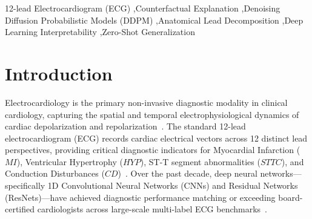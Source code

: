 \documentclass[12pt]{elsarticle}
\begin{document}
\begin{frontmatter}


\begin{keyword}
12-lead Electrocardiogram (ECG) \sep Counterfactual Explanation \sep Denoising Diffusion Probabilistic Models (DDPM) \sep Anatomical Lead Decomposition \sep Deep Learning Interpretability \sep Zero-Shot Generalization
\end{keyword}

\end{frontmatter}

\section{Introduction}
\label{sec:intro}

Electrocardiology is the primary non-invasive diagnostic modality in clinical cardiology, capturing the spatial and temporal electrophysiological dynamics of cardiac depolarization and repolarization~\cite{strodthoff2020deep}. The standard 12-lead electrocardiogram (ECG) records cardiac electrical vectors across 12 distinct lead perspectives, providing critical diagnostic indicators for Myocardial Infarction ($MI$), Ventricular Hypertrophy ($HYP$), ST-T segment abnormalities ($STTC$), and Conduction Disturbances ($CD$)~\cite{wagner2020ptb}. Over the past decade, deep neural networks—specifically 1D Convolutional Neural Networks (CNNs) and Residual Networks (ResNets)—have achieved diagnostic performance matching or exceeding board-certified cardiologists across large-scale multi-label ECG benchmarks~\cite{ribeiro2020automatic, hannun2019cardiologist}.
\end{document}
